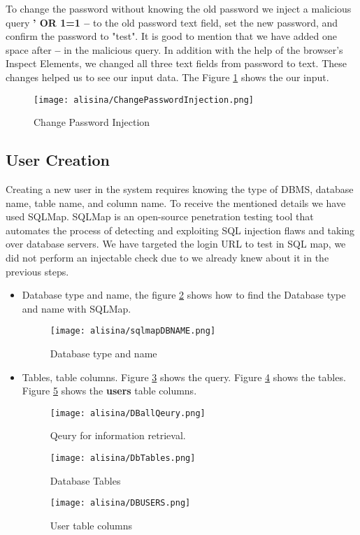 To change the password without knowing the old password we inject a malicious query \textbf{' OR 1=1 -- } to the old password text field, set the new password, and confirm the password to "test". 
It is good to mention that we have added one space after \textbf{--} in the malicious query.
In addition with the help of the browser's Inspect Elements, we changed all three text fields from password to text. 
These changes helped us to see our input data.
The Figure \ref{fig:ChangePasswordInjection} shows the our input.
\begin{figure}[H]
    \centering
    \texttt{[image: alisina/ChangePasswordInjection.png]}
    \caption{Change Password Injection}
    \label{fig:ChangePasswordInjection}
\end{figure}

\subsection{User Creation}
Creating a new user in the system requires knowing the type of DBMS, database name, table name, and column name. 
To receive the mentioned details we have used SQLMap.
SQLMap is an open-source penetration testing tool that automates the process of detecting and exploiting SQL injection flaws and taking over database servers.
We have targeted the login URL to test in SQL map, we did not perform an injectable check due to we already knew about it in the previous steps.
\begin{itemize}
    \item Database type and name, the figure \ref{fig:dbname} shows how to find the Database type and name with SQLMap. 
        \begin{figure}[H]
            \centering
            \texttt{[image: alisina/sqlmapDBNAME.png]}
            \caption{Database type and name}
            \label{fig:dbname}
        \end{figure}
    \item Tables, table columns. Figure \ref{fig:allInfoQeurySQLMAP} shows the query. Figure \ref{fig:dbTBs} shows the tables. Figure \ref{fig:userTableCol} shows the \textbf{users} table columns.
        \begin{figure}[H]
            \centering
            \texttt{[image: alisina/DBallQeury.png]}
            \caption{Qeury for information retrieval.}
            \label{fig:allInfoQeurySQLMAP}
        \end{figure}
        \begin{figure}[H]
            \centering
            \texttt{[image: alisina/DbTables.png]}
            \caption{Database Tables}
            \label{fig:dbTBs}
        \end{figure}
        \begin{figure}[H]
            \centering
            \texttt{[image: alisina/DBUSERS.png]}
            \caption{User table columns}
            \label{fig:userTableCol}
        \end{figure}
\end{itemize}

